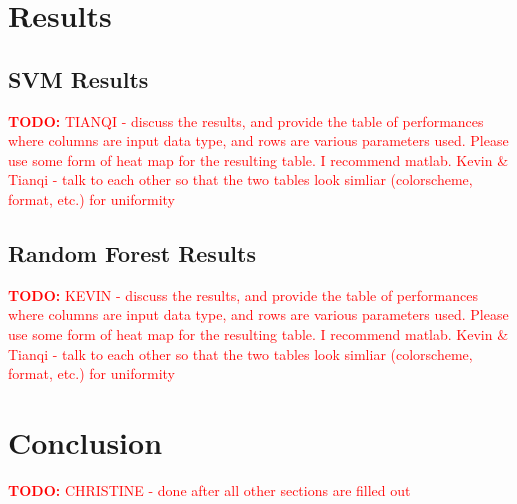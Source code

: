 \documentclass[paper=a4, fontsize=11pt]{scrartcl}
\numberwithin{equation}{section}    %
\numberwithin{figure}{section}      %
\numberwithin{table}{section}       %
\newcommand{\TODO}[1]{\textcolor{red}{\textbf{TODO: } #1}}
\numberwithin{equation}{section}    %
\numberwithin{figure}{section}      %
\numberwithin{table}{section}       %
\begin{document}

\section{Results}

\subsection{SVM Results}

\TODO{TIANQI - discuss the results, and provide the table of performances where columns are input data type, and rows are various parameters used. Please use some form of heat map for the resulting table. I recommend matlab. Kevin \& Tianqi - talk to each other so that the two tables look simliar (colorscheme, format, etc.) for uniformity}

\subsection{Random Forest Results}

\TODO{KEVIN - discuss the results, and provide the table of performances where columns are input data type, and rows are various parameters used. Please use some form of heat map for the resulting table. I recommend matlab. Kevin \& Tianqi - talk to each other so that the two tables look simliar (colorscheme, format, etc.) for uniformity}





\section{Conclusion}

\TODO{CHRISTINE - done after all other sections are filled out}





\end{document}
